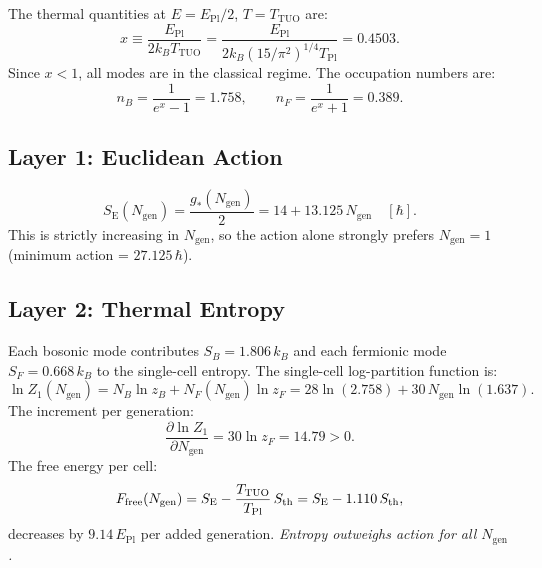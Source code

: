 \documentclass[12pt,a4paper]{article}
\theoremstyle{definition}
\newcommand{\TPl}{T_{\mathrm{Pl}}}
\newcommand{\EPl}{E_{\mathrm{Pl}}}
\newcommand{\TTUO}{T_{\mathrm{TUO}}}
\newcommand{\gstar}{g_{*}}
\newcommand{\Ngen}{N_{\mathrm{gen}}}
\newcommand{\Sact}{S_{\mathrm{E}}}
\newcommand{\Ffree}{F_{\mathrm{free}}}
\begin{document}
The thermal quantities at $E = \EPl/2$, $T = \TTUO$ are:
\begin{equation}
  x \equiv \frac{\EPl}{2k_B\TTUO} = \frac{\EPl}{2k_B(15/\pi^2)^{1/4}\TPl}
  = 0.4503.
\end{equation}
Since $x < 1$, all modes are in the classical regime. The occupation
numbers are:
\begin{equation}
  n_B = \frac{1}{e^x-1} = 1.758, \qquad
  n_F = \frac{1}{e^x+1} = 0.389.
\end{equation}

\subsection{Layer 1: Euclidean Action}

\begin{equation}
  \Sact(\Ngen) = \frac{\gstar(\Ngen)}{2}
  = 14 + 13.125\,\Ngen \quad [\hbar].
\end{equation}
This is strictly increasing in $\Ngen$, so the action alone strongly prefers
$\Ngen = 1$ (minimum action = $27.125\,\hbar$).

\subsection{Layer 2: Thermal Entropy}

Each bosonic mode contributes $S_B = 1.806\,k_B$ and each fermionic mode
$S_F = 0.668\,k_B$ to the single-cell entropy. The single-cell
log-partition function is:
\begin{equation}
  \ln Z_1(\Ngen) = N_B\ln z_B + N_F(\Ngen)\ln z_F
  = 28\ln(2.758) + 30\,\Ngen\ln(1.637).
\end{equation}
The increment per generation:
\begin{equation}
  \frac{\partial \ln Z_1}{\partial \Ngen} = 30\ln z_F = 14.79 > 0.
\end{equation}
The free energy per cell:
\begin{equation}
  \Ffree(\Ngen) = \Sact - \frac{\TTUO}{\TPl}\,S_{\rm th}
  = \Sact - 1.110\,S_{\rm th},
\end{equation}
decreases by $9.14\,\EPl$ per added generation.
\emph{Entropy outweighs action for all $\Ngen$.}
\end{document}
